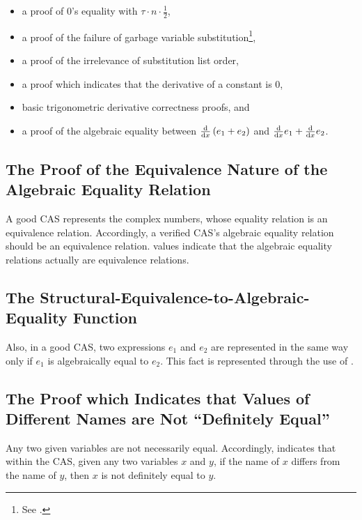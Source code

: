 \documentclass{report}
\begin{document}
\begin{itemize}
 \item a proof of \(0\)'s equality with \(\tau \cdot n \cdot \frac12\),
 \item a proof of the failure of garbage variable substitution\footnote{See .},
 \item a proof of the irrelevance of substitution list order,
 \item a proof which indicates that the derivative of a constant is \(0\),
 \item basic trigonometric derivative correctness proofs, and
 \item a proof of the algebraic equality between \(\derivative{x} \left(e_1 + e_2\right)\) and \(\derivative{x} e_1 + \derivative{x} e_2\).
\end{itemize}

\subsection{The Proof of the Equivalence Nature of the Algebraic Equality Relation}
A good CAS represents the complex numbers, whose equality relation is an equivalence relation.  Accordingly, a verified CAS's algebraic equality relation should be an equivalence relation.   values indicate that the algebraic equality relations actually are equivalence relations.

\subsection{The Structural-Equivalence-to-Algebraic-Equality Function}
Also, in a good CAS, two expressions \(e_1\) and \(e_2\) are represented in the same way only if \(e_1\) is algebraically equal to \(e_2\).  This fact is represented through the use of .

\subsection{The Proof which Indicates that Values of Different Names are Not ``Definitely Equal''}
Any two given variables are not necessarily equal.  Accordingly,   indicates that within the  CAS, given any two  variables \(x\) and \(y\), if the name of \(x\) differs from the name of \(y\), then \(x\) is not definitely equal to \(y\).
\end{document}
